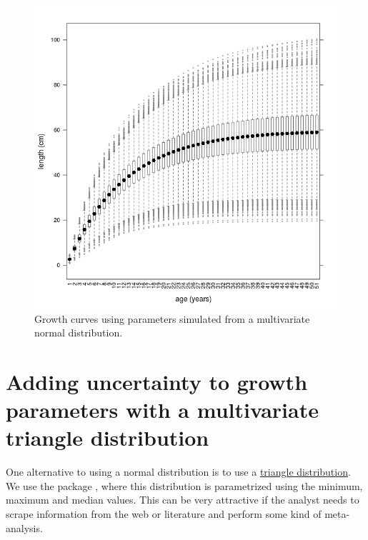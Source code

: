 \documentclass[a4paper,english,10pt]{article}\usepackage[]{graphicx}\usepackage[]{color}
\newenvironment{knitrout}{}{} %
\begin{document}
\begin{knitrout}
\color{fgcolor}\begin{figure}[H]

{\centering \includegraphics[width=.9\linewidth]{figure/plot_mv_growth-1} 

}

\caption[Growth curves using parameters simulated from a multivariate normal distribution]{Growth curves using parameters simulated from a multivariate normal distribution.}\label{fig:plot_mv_growth}
\end{figure}


\end{knitrout}

\section{Adding uncertainty to growth parameters with a multivariate triangle distribution}
\label{sec:growth_triangle_cop}

One alternative to using a normal distribution is to use a \href{http://en.wikipedia.org/wiki/Triangle\_distribution}{triangle distribution}. We use the package \href{http://cran.r-project.org/web/packages/triangle/index.html}{}, where this distribution is parametrized using the minimum, maximum and median values. This can be very attractive if the analyst needs to scrape information from the web or literature and perform some kind of meta-analysis.
\end{document}

